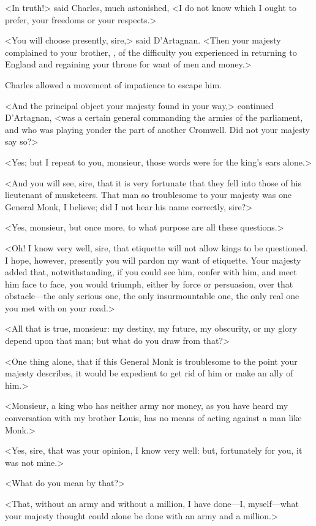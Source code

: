 <In truth!> said Charles, much astonished, <I do not know which I ought to prefer, your freedoms or your respects.>

<You will choose presently, sire,> said D'Artagnan. <Then your majesty complained to your brother, , of the difficulty you experienced in returning to England and regaining your throne for want of men and money.>

Charles allowed a movement of impatience to escape him.

<And the principal object your majesty found in your way,> continued D'Artagnan, <was a certain general commanding the armies of the parliament, and who was playing yonder the part of another Cromwell. Did not your majesty say so?>

<Yes; but I repeat to you, monsieur, those words were for the king's ears alone.>

<And you will see, sire, that it is very fortunate that they fell into those of his lieutenant of musketeers. That man so troublesome to your majesty was one General Monk, I believe; did I not hear his name correctly, sire?>

<Yes, monsieur, but once more, to what purpose are all these questions.>

<Oh! I know very well, sire, that etiquette will not allow kings to be questioned. I hope, however, presently you will pardon my want of etiquette. Your majesty added that, notwithstanding, if you could see him, confer with him, and meet him face to face, you would triumph, either by force or persuasion, over that obstacle—the only serious one, the only insurmountable one, the only real one you met with on your road.>

<All that is true, monsieur: my destiny, my future, my obscurity, or my glory depend upon that man; but what do you draw from that?>

<One thing alone, that if this General Monk is troublesome to the point your majesty describes, it would be expedient to get rid of him or make an ally of him.>

<Monsieur, a king who has neither army nor money, as you have heard my conversation with my brother Louis, has no means of acting against a man like Monk.>

<Yes, sire, that was your opinion, I know very well: but, fortunately for you, it was not mine.>

<What do you mean by that?>

<That, without an army and without a million, I have done—I, myself—what your majesty thought could alone be done with an army and a million.>

